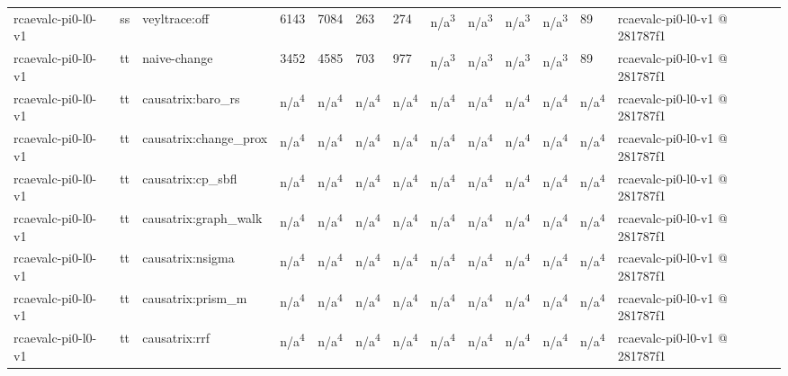 \begin{table}[t]
\begin{tabular}{lllllllllllll}
rcaevalc-pi0-l0-v1 & ss & veyltrace:off & 6143 & 7084 & 263 & 274 & n/a\textsuperscript{3} & n/a\textsuperscript{3} & n/a\textsuperscript{3} & n/a\textsuperscript{3} & 89 & rcaevalc-pi0-l0-v1 @ 281787f1 \\
rcaevalc-pi0-l0-v1 & tt & naive-change & 3452 & 4585 & 703 & 977 & n/a\textsuperscript{3} & n/a\textsuperscript{3} & n/a\textsuperscript{3} & n/a\textsuperscript{3} & 89 & rcaevalc-pi0-l0-v1 @ 281787f1 \\
rcaevalc-pi0-l0-v1 & tt & causatrix:baro\_rs & n/a\textsuperscript{4} & n/a\textsuperscript{4} & n/a\textsuperscript{4} & n/a\textsuperscript{4} & n/a\textsuperscript{4} & n/a\textsuperscript{4} & n/a\textsuperscript{4} & n/a\textsuperscript{4} & n/a\textsuperscript{4} & rcaevalc-pi0-l0-v1 @ 281787f1 \\
rcaevalc-pi0-l0-v1 & tt & causatrix:change\_prox & n/a\textsuperscript{4} & n/a\textsuperscript{4} & n/a\textsuperscript{4} & n/a\textsuperscript{4} & n/a\textsuperscript{4} & n/a\textsuperscript{4} & n/a\textsuperscript{4} & n/a\textsuperscript{4} & n/a\textsuperscript{4} & rcaevalc-pi0-l0-v1 @ 281787f1 \\
rcaevalc-pi0-l0-v1 & tt & causatrix:cp\_sbfl & n/a\textsuperscript{4} & n/a\textsuperscript{4} & n/a\textsuperscript{4} & n/a\textsuperscript{4} & n/a\textsuperscript{4} & n/a\textsuperscript{4} & n/a\textsuperscript{4} & n/a\textsuperscript{4} & n/a\textsuperscript{4} & rcaevalc-pi0-l0-v1 @ 281787f1 \\
rcaevalc-pi0-l0-v1 & tt & causatrix:graph\_walk & n/a\textsuperscript{4} & n/a\textsuperscript{4} & n/a\textsuperscript{4} & n/a\textsuperscript{4} & n/a\textsuperscript{4} & n/a\textsuperscript{4} & n/a\textsuperscript{4} & n/a\textsuperscript{4} & n/a\textsuperscript{4} & rcaevalc-pi0-l0-v1 @ 281787f1 \\
rcaevalc-pi0-l0-v1 & tt & causatrix:nsigma & n/a\textsuperscript{4} & n/a\textsuperscript{4} & n/a\textsuperscript{4} & n/a\textsuperscript{4} & n/a\textsuperscript{4} & n/a\textsuperscript{4} & n/a\textsuperscript{4} & n/a\textsuperscript{4} & n/a\textsuperscript{4} & rcaevalc-pi0-l0-v1 @ 281787f1 \\
rcaevalc-pi0-l0-v1 & tt & causatrix:prism\_m & n/a\textsuperscript{4} & n/a\textsuperscript{4} & n/a\textsuperscript{4} & n/a\textsuperscript{4} & n/a\textsuperscript{4} & n/a\textsuperscript{4} & n/a\textsuperscript{4} & n/a\textsuperscript{4} & n/a\textsuperscript{4} & rcaevalc-pi0-l0-v1 @ 281787f1 \\
rcaevalc-pi0-l0-v1 & tt & causatrix:rrf & n/a\textsuperscript{4} & n/a\textsuperscript{4} & n/a\textsuperscript{4} & n/a\textsuperscript{4} & n/a\textsuperscript{4} & n/a\textsuperscript{4} & n/a\textsuperscript{4} & n/a\textsuperscript{4} & n/a\textsuperscript{4} & rcaevalc-pi0-l0-v1 @ 281787f1 \\

\end{tabular}
\end{table}
